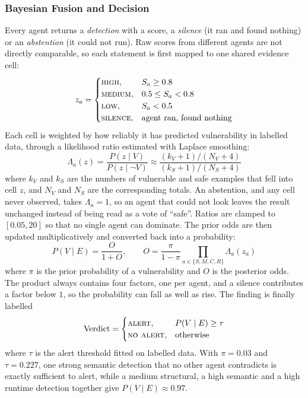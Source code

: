 \documentclass[conference]{IEEEtran}
\begin{document}
\subsubsection{Bayesian Fusion and Decision}
Every agent returns a \emph{detection} with a score, a \emph{silence} (it
ran and found nothing) or an \emph{abstention} (it could not run). Raw
scores from different agents are not directly comparable, so each statement
is first mapped to one shared evidence cell:
\begin{equation}
z_a=
\begin{cases}
\textsc{high}, & S_a \ge 0.8\\
\textsc{medium}, & 0.5 \le S_a < 0.8\\
\textsc{low}, & S_a < 0.5\\
\textsc{silence}, & \text{agent ran, found nothing}
\end{cases}
\label{eq:cell}
\end{equation}
Each cell is weighted by how reliably it has predicted vulnerability in
labelled data, through a likelihood ratio estimated with Laplace smoothing:
\begin{equation}
\Lambda_a(z)=\frac{P(z\mid V)}{P(z\mid\neg V)}\approx
\frac{(k_V+1)/(N_V+4)}{(k_S+1)/(N_S+4)}
\label{eq:lr}
\end{equation}
where $k_V$ and $k_S$ are the numbers of vulnerable and safe examples that
fell into cell $z$, and $N_V$ and $N_S$ are the corresponding totals. An
abstention, and any cell never observed, takes $\Lambda_a=1$, so an agent
that could not look leaves the result unchanged instead of being read as a
vote of ``safe''. Ratios are clamped to $[0.05,20]$ so that no single agent
can dominate. The prior odds are then updated multiplicatively and
converted back into a probability:
\begin{equation}
P(V\mid E)=\frac{O}{1+O},\qquad
O=\frac{\pi}{1-\pi}\prod_{a\in\{S,M,C,R\}}\Lambda_a(z_a)
\label{eq:post}
\end{equation}
where $\pi$ is the prior probability of a vulnerability and $O$ is the
posterior odds. The product always contains four factors, one per agent,
and a silence contributes a factor below $1$, so the probability can fall
as well as rise. The finding is finally labelled
\begin{equation}
\mathrm{Verdict}=
\begin{cases}
\textsc{alert}, & P(V\mid E)\ge\tau\\
\textsc{no alert}, & \text{otherwise}
\end{cases}
\label{eq:verdict}
\end{equation}
where $\tau$ is the alert threshold fitted on labelled data. With
$\pi=0.03$ and $\tau=0.227$, one strong semantic detection that no other
agent contradicts is exactly sufficient to alert, while a medium
structural, a high semantic and a high runtime detection together give
$P(V\mid E)\approx0.97$.
\end{document}

